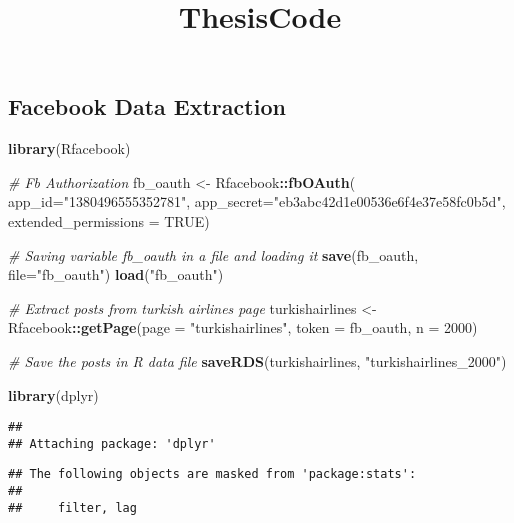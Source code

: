 \documentclass[]{article}
\title{ThesisCode}
\author{}
\date{}
\newenvironment{Shaded}{\begin{snugshade}}{\end{snugshade}}
\newcommand{\KeywordTok}[1]{\textcolor[rgb]{0.13,0.29,0.53}{\textbf{#1}}}
\newcommand{\DataTypeTok}[1]{\textcolor[rgb]{0.13,0.29,0.53}{#1}}
\newcommand{\DecValTok}[1]{\textcolor[rgb]{0.00,0.00,0.81}{#1}}
\newcommand{\StringTok}[1]{\textcolor[rgb]{0.31,0.60,0.02}{#1}}
\newcommand{\CommentTok}[1]{\textcolor[rgb]{0.56,0.35,0.01}{\textit{#1}}}
\newcommand{\OtherTok}[1]{\textcolor[rgb]{0.56,0.35,0.01}{#1}}
\newcommand{\OperatorTok}[1]{\textcolor[rgb]{0.81,0.36,0.00}{\textbf{#1}}}
\newcommand{\NormalTok}[1]{#1}
\begin{document}
\maketitle

\subsection{Facebook Data Extraction}\label{facebook-data-extraction}

\begin{Shaded}
\begin{Highlighting}[]
\KeywordTok{library}\NormalTok{(Rfacebook)}

\CommentTok{# Fb Authorization}
\NormalTok{fb_oauth <-}\StringTok{ }\NormalTok{Rfacebook}\OperatorTok{::}\KeywordTok{fbOAuth}\NormalTok{(}
  \DataTypeTok{app_id=}\StringTok{"1380496555352781"}\NormalTok{,}
  \DataTypeTok{app_secret=}\StringTok{"eb3abc42d1e00536e6f4e37e58fc0b5d"}\NormalTok{,}
  \DataTypeTok{extended_permissions =} \OtherTok{TRUE}\NormalTok{)}

\CommentTok{# Saving variable fb_oauth in a file and loading it}
\KeywordTok{save}\NormalTok{(fb_oauth, }\DataTypeTok{file=}\StringTok{"fb_oauth"}\NormalTok{)}
\KeywordTok{load}\NormalTok{(}\StringTok{"fb_oauth"}\NormalTok{)}

\CommentTok{# Extract posts from turkish airlines page}
\NormalTok{turkishairlines <-}\StringTok{ }\NormalTok{Rfacebook}\OperatorTok{::}\KeywordTok{getPage}\NormalTok{(}\DataTypeTok{page =} \StringTok{"turkishairlines"}\NormalTok{, }
                                      \DataTypeTok{token =}\NormalTok{ fb_oauth, }\DataTypeTok{n =} \DecValTok{2000}\NormalTok{)}

\CommentTok{# Save the posts in R data file}
\KeywordTok{saveRDS}\NormalTok{(turkishairlines, }\StringTok{"turkishairlines_2000"}\NormalTok{)}
\end{Highlighting}
\end{Shaded}

\begin{Shaded}
\begin{Highlighting}[]
\KeywordTok{library}\NormalTok{(dplyr)}
\end{Highlighting}
\end{Shaded}

\begin{verbatim}
## 
## Attaching package: 'dplyr'
\end{verbatim}

\begin{verbatim}
## The following objects are masked from 'package:stats':
## 
##     filter, lag
\end{verbatim}
\end{document}
